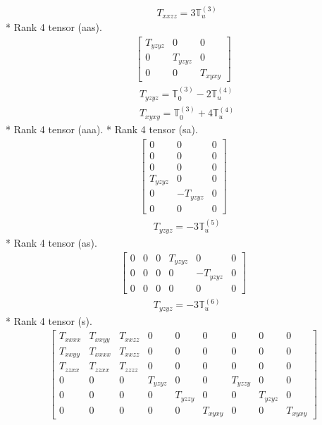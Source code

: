 \documentclass[fleqn,8pt,landscape]{jsarticle}
\begin{document}
\begin{align*}
& T_{xxzz} = 3 \mathbb{T}_{u}^{(3)}
\end{align*}
* Rank 4 tensor (aas).
\begin{align*}
\begin{bmatrix} T_{yzyz} & 0 & 0 \\ 0 & T_{yzyz} & 0 \\ 0 & 0 & T_{xyxy} \end{bmatrix}
\end{align*}
\begin{align*}
& T_{yzyz} = \mathbb{T}_{0}^{(3)} - 2 \mathbb{T}_{u}^{(4)} \\
& T_{xyxy} = \mathbb{T}_{0}^{(3)} + 4 \mathbb{T}_{u}^{(4)}
\end{align*}
* Rank 4 tensor (aaa).
* Rank 4 tensor (sa).
\begin{align*}
\begin{bmatrix} 0 & 0 & 0 \\ 0 & 0 & 0 \\ 0 & 0 & 0 \\ T_{yzyz} & 0 & 0 \\ 0 & - T_{yzyz} & 0 \\ 0 & 0 & 0 \end{bmatrix}
\end{align*}
\begin{align*}
& T_{yzyz} = - 3 \mathbb{T}_{u}^{(5)}
\end{align*}
* Rank 4 tensor (as).
\begin{align*}
\begin{bmatrix} 0 & 0 & 0 & T_{yzyz} & 0 & 0 \\ 0 & 0 & 0 & 0 & - T_{yzyz} & 0 \\ 0 & 0 & 0 & 0 & 0 & 0 \end{bmatrix}
\end{align*}
\begin{align*}
& T_{yzyz} = - 3 \mathbb{T}_{u}^{(6)}
\end{align*}
* Rank 4 tensor (s).
\begin{align*}
\begin{bmatrix} T_{xxxx} & T_{xxyy} & T_{xxzz} & 0 & 0 & 0 & 0 & 0 & 0 \\ T_{xxyy} & T_{xxxx} & T_{xxzz} & 0 & 0 & 0 & 0 & 0 & 0 \\ T_{zzxx} & T_{zzxx} & T_{zzzz} & 0 & 0 & 0 & 0 & 0 & 0 \\ 0 & 0 & 0 & T_{yzyz} & 0 & 0 & T_{yzzy} & 0 & 0 \\ 0 & 0 & 0 & 0 & T_{yzzy} & 0 & 0 & T_{yzyz} & 0 \\ 0 & 0 & 0 & 0 & 0 & T_{xyxy} & 0 & 0 & T_{xyxy} \end{bmatrix}
\end{align*}
\end{document}
